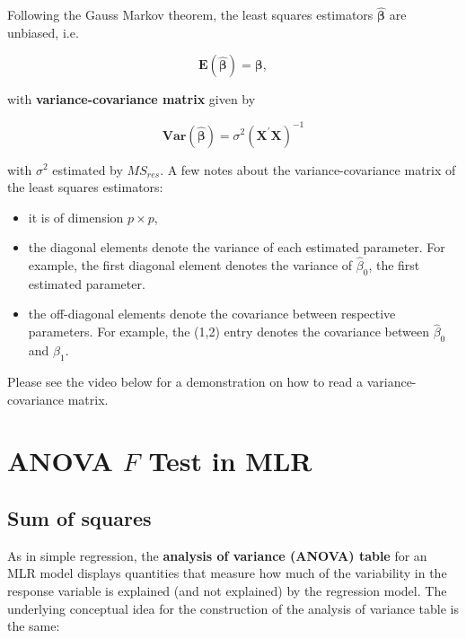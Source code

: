 \documentclass[
]{book}
\providecommand{\tightlist}{%
  \setlength{\itemsep}{0pt}\setlength{\parskip}{0pt}}
\begin{document}
Following the Gauss Markov theorem, the least squares estimators \(\boldsymbol{\hat{\beta}}\) are unbiased, i.e.

\begin{equation} 
\boldsymbol{E\left(\hat{\beta}\right)} = \boldsymbol{\beta},
\label{eq:6mean2}
\end{equation}

with \textbf{variance-covariance matrix} given by

\begin{equation} 
\boldsymbol{Var}\left(\boldsymbol{\hat{\beta}}\right) = \sigma^{2}\left(\boldsymbol{X^{\prime}X} \right)^{-1}
\label{eq:6cov2}
\end{equation}

with \(\sigma^{2}\) estimated by \(MS_{res}\). A few notes about the variance-covariance matrix of the least squares estimators:

\begin{itemize}
\tightlist
\item
  it is of dimension \(p \times p\),
\item
  the diagonal elements denote the variance of each estimated parameter. For example, the first diagonal element denotes the variance of \(\hat{\beta}_0\), the first estimated parameter.
\item
  the off-diagonal elements denote the covariance between respective parameters. For example, the (1,2) entry denotes the covariance between \(\hat{\beta}_0\) and \(\hat{\beta}_1\).
\end{itemize}

Please see the video below for a demonstration on how to read a variance-covariance matrix.

\hypertarget{anova-f-test-in-mlr}{%
\section{\texorpdfstring{ANOVA \(F\) Test in MLR}{ANOVA F Test in MLR}}\label{anova-f-test-in-mlr}}

\hypertarget{sum-of-squares-1}{%
\subsection{Sum of squares}\label{sum-of-squares-1}}

As in simple regression, the \textbf{analysis of variance (ANOVA) table} for an MLR model displays quantities that measure how much of the variability in the response variable is explained (and not explained) by the regression model. The underlying conceptual idea for the construction of the analysis of variance table is the same:
\end{document}
